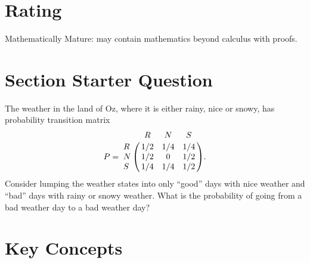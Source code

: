 \documentclass[12pt]{article}
\begin{document}
\myheader \mytitle

\hr


\hr

\usefirefox

\hr



\section*{Rating} %
Mathematically Mature:  may contain mathematics beyond calculus with
proofs.  %

\hr

\section*{Section Starter Question}

The weather in the land of Oz, where it is either rainy, nice or snowy,
has probability transition matrix
\[
    P = \bordermatrix{ & R & N & S \cr
    R & 1/2 & 1/4 & 1/4 \cr
    N & 1/2 & 0 & 1/2 \cr
    S & 1/4 & 1/4 & 1/2 }.
\] Consider lumping the weather states into only ``good'' days with nice
weather and ``bad'' days with rainy or snowy weather. What is the
probability of going from a bad weather day to a bad weather day?

\hr

\section*{Key Concepts}
\end{document}
